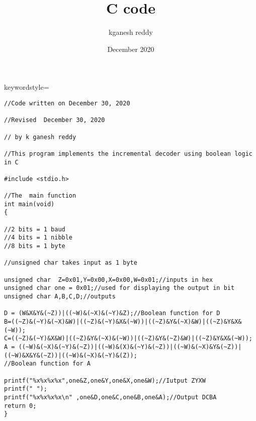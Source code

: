 keywordstyle=\colo\documentclass{article}
\title{C code}
\author{kganesh reddy}
\date{December 2020}
\begin{document}
\maketitle

\begin{lstlisting}[style=CStyle]
//Code written on December 30, 2020

//Revised  December 30, 2020

// by k ganesh reddy

//This program implements the incremental decoder using boolean logic in C

#include <stdio.h>

//The  main function
int main(void)
{

//2 bits = 1 baud
//4 bits = 1 nibble
//8 bits = 1 byte

//unsigned char takes input as 1 byte

unsigned char  Z=0x01,Y=0x00,X=0x00,W=0x01;//inputs in hex	
unsigned char one = 0x01;//used for displaying the output in bit
unsigned char A,B,C,D;//outputs

D = (W&X&Y&(~Z))|((~W)&(~X)&(~Y)&Z);//Boolean function for D
B=((~Z)&(~Y)&(~X)&W)|((~Z)&(~Y)&X&(~W))|((~Z)&Y&(~X)&W)|((~Z)&Y&X&(~W));
C=((~Z)&(~Y)&X&W)|((~Z)&Y&(~X)&(~W))|((~Z)&Y&(~Z)&W)|((~Z)&Y&X&(~W));
A = ((~W)&(~X)&(~Y)&(~Z))|((~W)&(X)&(~Y)&(~Z))|((~W)&(~X)&Y&(~Z))|((~W)&X&Y&(~Z))|((~W)&(~X)&(~Y)&(Z));
//Boolean function for A

printf("%x%x%x%x",one&Z,one&Y,one&X,one&W);//Iutput ZYXW
printf(" ");
printf("%x%x%x%x\n" ,one&D,one&C,one&B,one&A);//Output DCBA
return 0;
}

\end{lstlisting}
\end{document}
